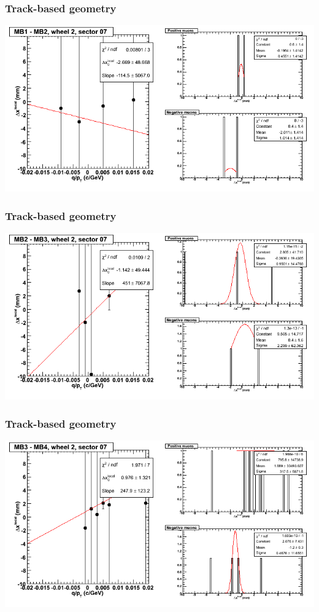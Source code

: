 \documentclass[compress]{beamer}
\begin{document}
\begin{frame}
\frametitle{Track-based geometry}
\includegraphics[width=\linewidth]{NOV4_segdiffs/dt13_resid_E_07_12.png}
\end{frame}

\begin{frame}
\frametitle{Track-based geometry}
\includegraphics[width=\linewidth]{NOV4_segdiffs/dt13_resid_E_07_23.png}
\end{frame}

\begin{frame}
\frametitle{Track-based geometry}
\includegraphics[width=\linewidth]{NOV4_segdiffs/dt13_resid_E_07_34.png}
\end{frame}
\end{document}
